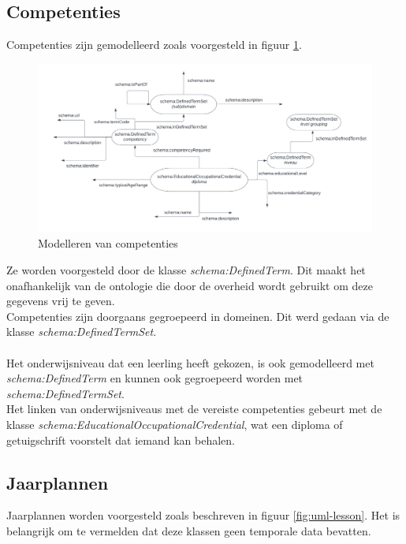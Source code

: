 \documentclass[12pt,journal]{IEEEtran}
\begin{document}
	\subsection{Competenties}
	\noindent Competenties zijn gemodelleerd zoals voorgesteld in figuur \ref{fig:uml-comp}.
	
	\begin{figure}[h]
		\caption{Modelleren van competenties}
		\label{fig:uml-comp}
		\includegraphics[scale=0.3]{uml-competencies.png}
	\end{figure}
	\noindent Ze worden voorgesteld door de klasse \textit{schema:DefinedTerm}. Dit maakt het onafhankelijk van de ontologie die door de overheid wordt gebruikt om deze gegevens vrij te geven.\\
	Competenties zijn doorgaans gegroepeerd in domeinen. Dit werd gedaan via de klasse \textit{schema:DefinedTermSet}.\\ \\
	Het onderwijsniveau dat een leerling heeft gekozen, is ook gemodelleerd met \textit{schema:DefinedTerm} en kunnen ook gegroepeerd worden met \textit{schema:DefinedTermSet}.\\
	Het linken van onderwijsniveaus met de vereiste competenties gebeurt met de klasse \textit{schema:EducationalOccupationalCredential}, wat een diploma of getuigschrift voorstelt dat iemand kan behalen.
	
	\subsection{Jaarplannen}
	\label{subsection:yearplan}
	\noindent Jaarplannen worden voorgesteld zoals beschreven in figuur \ref{fig:uml-lesson}.
	Het is belangrijk om te vermelden dat deze klassen geen temporale data bevatten.
\end{document}
